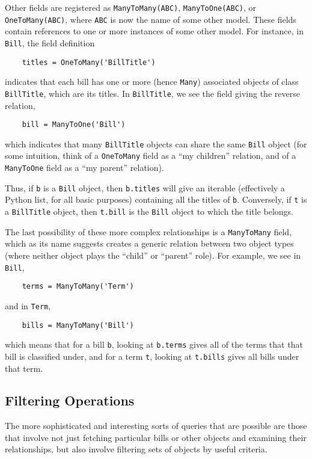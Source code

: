 \documentclass[11pt,letterpaper]{article}
\theoremstyle{plain}
\begin{document}
Other fields are registered as \texttt{ManyToMany(ABC)},
\texttt{ManyToOne(ABC)}, or \texttt{OneToMany(ABC)}, where
\texttt{ABC} is now the name of some other model.  These fields
contain references to one or more instances of some other model.  For
instance, in \texttt{Bill}, the field definition
\begin{verbatim}
    titles = OneToMany('BillTitle')
\end{verbatim}
indicates that each bill has one or more (hence \texttt{Many})
associated objects of class \texttt{BillTitle}, which are its titles.
In \texttt{BillTitle}, we see the field giving the reverse relation,
\begin{verbatim}
    bill = ManyToOne('Bill')
\end{verbatim}
which indicates that many \texttt{BillTitle} objects can share the
same \texttt{Bill} object (for some intuition, think of a
\texttt{OneToMany} field as a ``my children'' relation, and of a
\texttt{ManyToOne} field as a ``my parent'' relation).

Thus, if \texttt{b} is a \texttt{Bill} object, then \texttt{b.titles}
will give an iterable (effectively a Python list, for all basic
purposes) containing all the titles of \texttt{b}.  Conversely, if
\texttt{t} is a \texttt{BillTitle} object, then \texttt{t.bill} is the
\texttt{Bill} object to which the title belongs.

The last possibility of these more complex relationships is a
\texttt{ManyToMany} field, which as its name suggests creates a
generic relation between two object types (where neither object plays
the ``child'' or ``parent'' role).  For example, we see in
\texttt{Bill},
\begin{verbatim}
    terms = ManyToMany('Term')
\end{verbatim}
and in \texttt{Term},
\begin{verbatim}
    bills = ManyToMany('Bill')
\end{verbatim}
which means that for a bill \texttt{b}, looking at \texttt{b.terms} gives all of the terms that that bill is classified under, and for a term \texttt{t}, looking at \texttt{t.bills} gives all bills under that term.

\bigskip
\subsection{Filtering Operations}

The more sophisticated and interesting sorts of queries that are
possible are those that involve not just fetching particular bills or
other objects and examining their relationships, but also involve
filtering sets of objects by useful criteria.  
\end{document}
